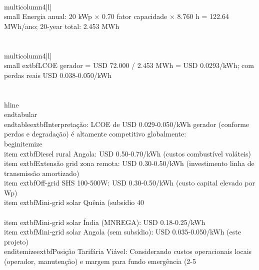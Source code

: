 \documentclass[12pt, a4paper]{article}
\begin{document}
{{{{{{{{\\multicolumn{4}{|l|}{\\small Energia anual: 20 kWp × 0.70 fator capacidade × 8.760 h = 122.64 MWh/ano; 20-year total: 2.453 MWh} \\\\
\\multicolumn{4}{|l|}{\\small 	extbf{LCOE gerador = USD 72.000 / 2.453 MWh = USD 0.0293/kWh}; com perdas reais USD 0.038-0.050/kWh} \\\\
\\hline
\\end{tabular}
\\end{table}\n\n	extbf{Interpretação:} LCOE de USD 0.029-0.050/kWh gerador (conforme perdas e degradação) é altamente competitivo globalmente:
\\begin{itemize}
\\item 	extbf{Diesel rural Angola}: USD 0.50-0.70/kWh (custos combustível voláteis)
\\item 	extbf{Extensão grid zona remota}: USD 0.30-0.50/kWh (investimento linha de transmissão amortizado)
\\item 	extbf{Off-grid SHS 100-500W}: USD 0.30-0.50/kWh (custo capital elevado por Wp)
\\item 	extbf{Mini-grid solar Quênia (subsídio 40\\%
\\item 	extbf{Mini-grid solar Índia (MNREGA)}: USD 0.18-0.25/kWh
\\item 	extbf{Mini-grid solar Angola (sem subsídio)}: USD 0.035-0.050/kWh (este projeto)
\\end{itemize}\n\n	extbf{Posição Tarifária Viável:} Considerando custos operacionais locais (operador, manutenção) e margem para fundo emergência (2-5\\%

}}}}}}}}}
\end{document}

